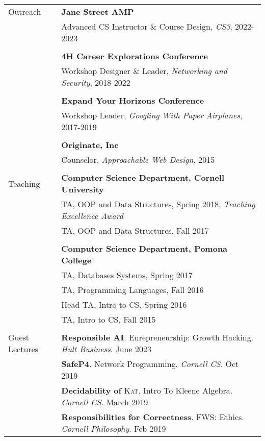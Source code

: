 \documentclass[letterpaper,10pt,oneside]{article}
\begin{document}
\begin{tabular}{@{} l l }
  \Large{Outreach}
  & \textbf{Jane Street AMP} \\
  & Advanced CS Instructor \& Course Design, \emph{CS3}, 2022-2023 \\
  \\

  & \textbf{4H Career Explorations Conference} \\
  & Workshop Designer \& Leader, \emph{Networking and Security}, 2018-2022 \\
  & \\
  & \textbf{Expand Your Horizons Conference} \\
  & Workshop Leader, \emph{Googling With Paper Airplanes}, 2017-2019 \\
  & \\
  & \textbf{Originate, Inc} \\
  & Counselor, \emph{Approachable Web Design}, 2015 \\
  & \\

  \Large{Teaching}
  & \textbf{Computer Science Department, Cornell University} \\
  
  & TA, OOP and Data Structures, Spring 2018, \textit{Teaching Excellence Award} \\
  & TA, OOP and Data Structures, Fall 2017 \\
  &\\
  
  & \textbf{Computer Science Department, Pomona College} \\
  & TA, Databases Systems, Spring 2017 \\
  & TA, Programming Languages, Fall 2016 \\
  & Head TA, Intro to CS, Spring 2016 \\
  & TA, Intro to CS, Fall 2015 \\
  &\\

  \Large{Guest Lectures}
  & \textbf{Responsible AI}. Enrepreneurship: Growth Hacking. \textit{Hult Business}. June 2023\\
  & \textbf{SafeP4}. Network Programming. \textit{Cornell CS}. Oct 2019 \\
  & \textbf{Decidability of }\textsc{Kat}. Intro To Kleene Algebra. \textit{Cornell CS}. March 2019 \\
  & \textbf{Responsibilities for Correctness}. FWS: Ethics. \textit{Cornell Philosophy}. Feb 2019\\

\end{tabular}
\end{document}
